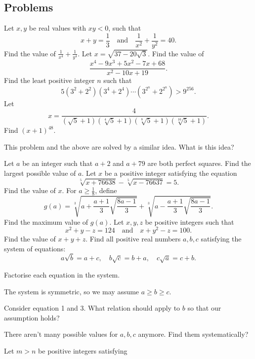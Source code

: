 \documentclass[../jarvis.tex]{subfiles}
\begin{document}
\subsection{Problems}
\problem[2014 SMO(J) P29]Let $x,y$ be real values with $xy<0$, such that
$$x+y=\frac{1}{3}\quad\text{and}\quad\frac{1}{x^2}+\frac{1}{y^2}=40.$$
Find the value of $\frac{1}{x^4}+\frac{1}{y^4}$.
\problem[2014 SMO(S) P20]Let $x=\sqrt{37-20\sqrt{3}}$. Find the value of 
$$\frac{x^4-9x^3+5x^2-7x+68}{x^2-10x+19}.$$
\problem[2017 SMO(S) P29]Find the least positive integer $n$ such that
$$5(3^2+2^2)(3^4+2^4)\cdots(3^{2^n}+2^{2^n})>9^{256}.$$
\problem[2005 AIME II/7]Let 
$$x=\frac{4}{(\sqrt{5}+1)(\sqrt[4]{5}+1)(\sqrt[8]{5}+1)(\sqrt[16]{5}+1)}.$$
Find $(x+1)^{48}.$
\begin{remark}
    This problem and the above are solved by a similar idea. What is this idea?
\end{remark}
\problem[2017 SMO(J) P24]Let $a$ be an integer such that $a+2$ and $a+79$ are both perfect squares. Find the largest possible value of $a$.
\problem[2020 SMO(J) P25]Let $x$ be a positive integer satisfying the equation
$$\sqrt[5]{x+76638}-\sqrt[5]{x-76637}=5.$$
Find the value of $x$.
\problem[2014 SMO(J) P32]For $a\geq\frac{1}{8}$, define
$$g(a)=\sqrt[3]{a+\frac{a+1}{3}\sqrt{\frac{8a-1}{3}}}+\sqrt[3]{a-\frac{a+1}{3}\sqrt{\frac{8a-1}{3}}}.$$
Find the maximum value of $g(a)$.
\problem[2016 SMO(J) P28]Let $x,y,z$ be positive integers such that
$$x^2+y-z=124\quad\text{and}\quad x+y^2-z=100.$$
Find the value of $x+y+z$.
\problem[2014 SMO(S) R2/2]Find all positive real numbers $a,b,c$ satisfying the system of equations:
$$a\sqrt{b}=a+c,\quad b\sqrt{c}=b+a,\quad c\sqrt{a}=c+b.$$
\begin{hints}
    \begin{hint}
        Factorise each equation in the system.
    \end{hint}
    \begin{hint}
        The system is symmetric, so we may assume $a\geq b\geq c$.
    \end{hint}
    \begin{hint}
        Consider equation 1 and 3. What relation should apply to $b$ so that our assumption holds? 
    \end{hint}
    \begin{hint}
        There aren't many possible values for $a,b,c$ anymore. Find them systematically?
    \end{hint}
\end{hints}
\problem[2020 SMO(J) P24]Let $m>n$ be positive integers satisfying
\end{document}
